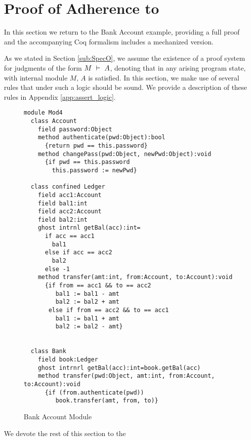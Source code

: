 \section{Proof of Adherence to {{}}}
\label{s:examples}

In this section we return to the Bank Account example, 
providing a full proof and
the accompanying Coq formalism includes a mechanized version.


As we stated in Section \ref{sub:SpecO}, 
we assume the existence of a proof system for judgments
of the form $M\ \vdash\ A$, denoting that in 
any arising program state, with internal module $M$, $A$ is satisfied. 
In this section, we make use of several rules that under such a logic should be sound.
We provide a description of these rules in Appendix \ref{app:assert_logic}. 

\begin{figure}[t]
\begin{lstlisting}[mathescape=true, frame=lines]
module Mod4
  class Account
    field password:Object
    method authenticate(pwd:Object):bool
      {return pwd == this.password}
    method changePass(pwd:Object, newPwd:Object):void
      {if pwd == this.password
        this.password := newPwd}

  class confined Ledger
    field acc1:Account
    field bal1:int
    field acc2:Account
    field bal2:int
    ghost intrnl getBal(acc):int=
      if acc == acc1
        bal1
      else if acc == acc2
        bal2
      else -1
    method transfer(amt:int, from:Account, to:Account):void
      {if from == acc1 && to == acc2
         bal1 := bal1 - amt
         bal2 := bal2 + amt
       else if from == acc2 && to == acc1
         bal1 := bal1 + amt
         bal2 := bal2 - amt}
      

  class Bank
    field book:Ledger
    ghost intrnrl getBal(acc):int=book.getBal(acc)
    method transfer(pwd:Object, amt:int, from:Account, to:Account):void
      {if (from.authenticate(pwd))
         book.transfer(amt, from, to)}
\end{lstlisting}
\caption{Bank Account Module}
\label{f:ex-bank-short}
\end{figure}
We devote the rest of this section to the   

